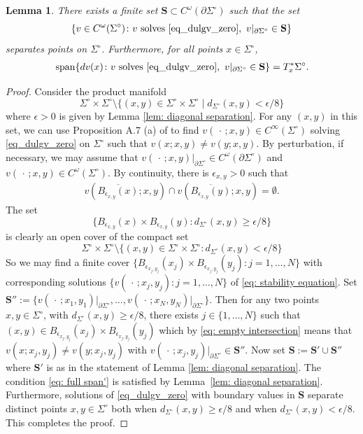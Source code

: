 \documentclass[11pt]{amsart}
\newtheorem{Lemma}[Theorem]{Lemma}
\theoremstyle{definition}
\numberwithin{equation}{section}
\newcommand{\p}{\partial}
\newcommand{\SSS}{\mathbf S}
\newcommand{\ccdot}{\,\cdot\,}
\begin{document}
\begin{Lemma}
\label{lem: off diagonal separation}
There exists a finite set $\SSS\subset C^\omega(\p\Sigma^\circ)$ such that the set 
$$\{v\in C^\omega(\Sigma^\circ)\colon %
v\ {\rm solves}\ \eqref{eq_dulgv_zero},\  v\vert_{\partial\Sigma^\circ}\in \SSS\}$$
separates points on $\Sigma^\circ$. Furthermore, for all points $x\in\Sigma^\circ$, 
\begin{eqnarray}\label{eq: full span'}
{\rm span}\{dv(x) \colon %
v\ {\rm solves}\ \eqref{eq_dulgv_zero}, \
v\vert_{\partial \Sigma^\circ} \in \SSS\} = T^*_x\Sigma^\circ.
\end{eqnarray}
\end{Lemma}
\begin{proof}
Consider the product manifold
$$\Sigma^\circ\times\Sigma^\circ \setminus \{(x,y)\in \Sigma^\circ\times\Sigma^\circ\mid d_{\Sigma^\circ}(x,y)<\epsilon/8\}$$
where $\epsilon>0$ is given by Lemma \ref{lem: diagonal separation}. For any $(x,y)$ in this set, we can use Proposition A.7 (a) of \cite{LLS} to find $v(\ccdot; x,y)\in C^{\infty}(\Sigma^\circ)$ solving \eqref{eq_dulgv_zero} on $\Sigma^\circ$ such that $v(x;x,y) \neq v(y; x,y)$. By perturbation, if necessary, we may assume that $v(\ccdot; x,y)|_{\partial \Sigma^\circ}\in C^\omega(\partial \Sigma^\circ)$ and $v(\ccdot; x,y)\in C^\omega(\Sigma^\circ)$. By continuity, there is $\epsilon_{x,y}>0$ such that \begin{eqnarray}\label{eq: empty intersection}
v(\overline{B_{\epsilon_{x,y}}(x)}; x,y)\cap v(\overline{B_{\epsilon_{x,y}}(y)}; x,y) = \emptyset.
\end{eqnarray}
The set
$$\{B_{\epsilon_{x,y}}(x) \times B_{\epsilon_{x,y}}(y)\colon d_{\Sigma^\circ}(x,y) \geq \epsilon/8\}$$
is clearly an open cover of the compact set 
$$\Sigma^\circ\times\Sigma^\circ \setminus \{(x,y)\in \Sigma^\circ\times \Sigma^\circ\colon d_{\Sigma^\circ}(x,y)<\epsilon/8\}$$
So we may find a finite cover $\{B_{\epsilon_{x_j,y_j}}(x_j) \times B_{\epsilon_{x_j,y_j}}(y_j)\colon j = 1,\dots, N\}$ with corresponding solutions
$\{v(\ccdot; x_j,y_j)\colon j = 1, \dots, N\}$ of \eqref{eq: stability equation}. Set $\SSS'' := \{v(\ccdot; x_1,y_1)\vert_{\partial\Sigma^\circ},\dots, v(\ccdot; x_N,y_N)\vert_{\partial\Sigma^\circ} \}$. Then for any two points $x,y\in \Sigma^\circ$, with $d_{\Sigma^\circ}(x,y) \geq \epsilon/8$, there exists $j\in\{1,\dots, N\}$ such that $(x,y) \in B_{\epsilon_{x_j, y_j}}(x_j) \times B_{\epsilon_{x_j, y_j}}(y_j)$ which by \eqref{eq: empty intersection} means that $v(x; x_j, y_j) \neq v(y;x_j, y_j)$ with $v(\ccdot ;x_j,y_j)\vert_{\partial \Sigma^\circ} \in \SSS''$. Now set $\SSS := \SSS'\cup \SSS''$ where $\SSS'$ is as in the statement of Lemma \ref{lem: diagonal separation}. The condition \eqref{eq: full span'} is satisfied by Lemma~\ref{lem: diagonal separation}. Furthermore, solutions of \eqref{eq_dulgv_zero} with boundary values in $\SSS$ separate distinct points $x,y\in \Sigma^\circ$ both when $d_{\Sigma^\circ}(x,y)\geq \epsilon/8$ and when $d_{\Sigma^\circ}(x,y) <\epsilon/8$. This completes the proof.
\end{proof}
\end{document}
